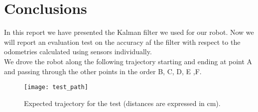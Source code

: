 \chapter{Conclusions}

In this report we have presented the Kalman filter we used for our robot. Now we will report an evaluation test on the accuracy af the filter with respect to the odometries calculated using sensors individually.\\

We drove the robot along the following trajectory starting and ending at point A and passing through the other points in the order B, C, D, E ,F.
\begin{figure}[!ht]
	\texttt{[image: test\_path]}
	\captionsetup{justification=centering, margin=1.5cm}
	\centering
	\caption{Expected trajectory for the test (distances are expressed in cm).}
	\centering
\end{figure}

